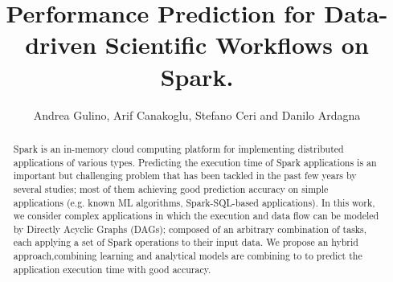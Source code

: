 \documentclass[a4paper, 10pt, conference]{ieeeconf}      %
\title{\LARGE \bf
Performance Prediction for Data-driven Scientific Workflows on Spark. 
}
\author{Andrea Gulino, Arif Canakoglu, Stefano Ceri and Danilo Ardagna}
\begin{document}
\maketitle
\thispagestyle{empty}
\pagestyle{empty}


\begin{abstract}

Spark is an in-memory cloud computing platform for implementing distributed applications of various types.
Predicting the execution time of Spark applications is an important but challenging problem that has been tackled in the past few years by several studies; most of them achieving good prediction accuracy on simple applications (e.g. known ML algorithms, Spark-SQL-based applications).
In this work, we consider complex applications in which the execution and data flow can be modeled by Directly Acyclic Graphs (DAGs); composed of an arbitrary combination of tasks, each applying a set of Spark operations to their input data.
We propose an hybrid approach,combining  learning and analytical models are combining to to predict the application execution time with good accuracy. 


\end{abstract}
\end{document}
